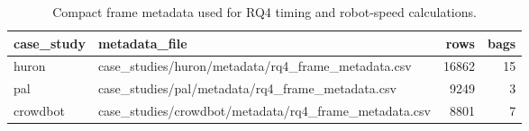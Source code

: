 \begin{table}[tbp]
\caption{Compact frame metadata used for RQ4 timing and robot-speed calculations.}
\label{tab:rq4-metadata-counts}
\begin{tabular}{llrr}
\toprule
case\_study & metadata\_file & rows & bags \\
\midrule
huron & case\_studies/huron/metadata/rq4\_frame\_metadata.csv & 16862 & 15 \\
pal & case\_studies/pal/metadata/rq4\_frame\_metadata.csv & 9249 & 3 \\
crowdbot & case\_studies/crowdbot/metadata/rq4\_frame\_metadata.csv & 8801 & 7 \\
\bottomrule
\end{tabular}
\end{table}
